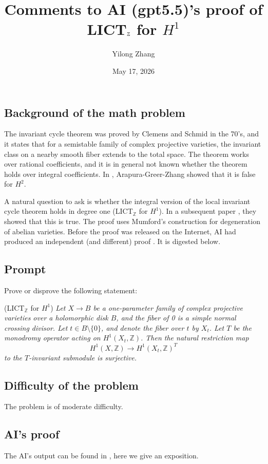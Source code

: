\documentclass[12pt]{amsart}
\title{Comments to AI (gpt5.5)'s proof of LICT$_\Z$ for $H^1$}
\author{Yilong Zhang}
\date{May 17, 2026}
\newcommand{\Z}{\mathbb{Z}}
\begin{document}
\maketitle


\subsection{Background of the math problem}


The invariant cycle theorem was proved by Clemens and Schmid in the 70's, and it states that for a semistable family of complex projective varieties, the invariant class on a nearby smooth fiber extends to the total space. The theorem works over rational coefficients, and it is in general not known whether the theorem holds over integral coefficients. In \cite{AGZ_v1}, Arapura-Greer-Zhang showed that it is false for $H^2$. 

A natural question to ask is whether the integral version of the local invariant cycle theorem holds in degree one (LICT$_\Z$ for $H^1$). In a subsequent paper \cite{AGZ_v2}, they showed that this is true. The proof uses Mumford's construction for degeneration of abelian varieties. Before the proof was released on the Internet, AI had produced an independent (and different) proof \cite{AI}. It is digested below.

\subsection{Prompt}
Prove or disprove the following statement:

(LICT$_\Z$ for $H^1$) \textit{Let \( X \to B \) be a one-parameter family of complex projective varieties over a holomorphic disk \( B \), and the fiber of 0 is a simple normal crossing divisor. Let \( t \in B \setminus \{0\} \), and denote the fiber over \( t \) by \( X_t \). Let \( T \) be the monodromy operator acting on \( H^1(X_t, \mathbb{Z}) \). Then the natural restriction map
\[
H^1(X, \mathbb{Z}) \to H^1(X_t, \mathbb{Z})^T
\]
to the \( T \)-invariant submodule is surjective.}

\subsection{Difficulty of the problem} The problem is of moderate difficulty.

\subsection{AI's proof} The AI's output can be found in \cite{AI}, here we give an exposition. 
\end{document}
